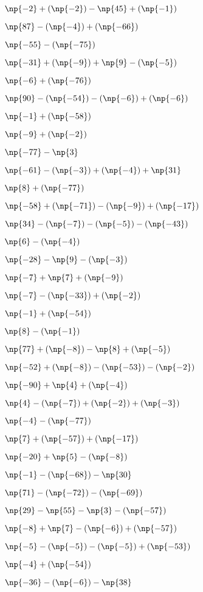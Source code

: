 {{\item$\np{-2} + (\np{-2}) - \np{45} + (\np{-1})$  \item$\np{87} - (\np{-4}) + (\np{-66})$  \item$\np{-55} - (\np{-75})$

\item$\np{-31} + (\np{-9}) + \np{9} - (\np{-5})$  \item$\np{-6} + (\np{-76})$  \item$\np{90} - (\np{-54}) - (\np{-6}) + (\np{-6})$

\item$\np{-1} + (\np{-58})$  \item$\np{-9} + (\np{-2})$  \item$\np{-77} - \np{3}$

\item$\np{-61} - (\np{-3}) + (\np{-4}) + \np{31}$  \item$\np{8} + (\np{-77})$  \item$\np{-58} + (\np{-71}) - (\np{-9}) + (\np{-17})$

\item$\np{34} - (\np{-7}) - (\np{-5}) - (\np{-43})$  \item$\np{6} - (\np{-4})$  \item$\np{-28} - \np{9} - (\np{-3})$

\item$\np{-7} + \np{7} + (\np{-9})$  \item$\np{-7} - (\np{-33}) + (\np{-2})$  \item$\np{-1} + (\np{-54})$

\item$\np{8} - (\np{-1})$  \item$\np{77} + (\np{-8}) - \np{8} + (\np{-5})$  \item$\np{-52} + (\np{-8}) - (\np{-53}) - (\np{-2})$

\item$\np{-90} + \np{4} + (\np{-4})$  \item$\np{4} - (\np{-7}) + (\np{-2}) + (\np{-3})$  \item$\np{-4} - (\np{-77})$

\item$\np{7} + (\np{-57}) + (\np{-17})$  \item$\np{-20} + \np{5} - (\np{-8})$  \item$\np{-1} - (\np{-68}) - \np{30}$

\item$\np{71} - (\np{-72}) - (\np{-69})$  \item$\np{29} - \np{55} - \np{3} - (\np{-57})$  \item$\np{-8} + \np{7} - (\np{-6}) + (\np{-57})$

\item$\np{-5} - (\np{-5}) - (\np{-5}) + (\np{-53})$  \item$\np{-4} + (\np{-54})$  \item$\np{-36} - (\np{-6}) - \np{38}$

}}

